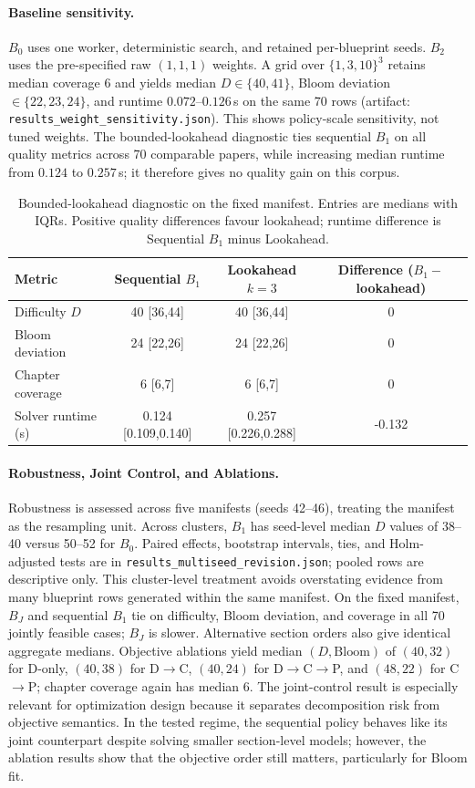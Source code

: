 \documentclass[runningheads]{llncs}
\begin{document}
\paragraph{Baseline sensitivity.} $B_0$ uses one worker, deterministic search, and retained per-blueprint seeds. $B_2$ uses the pre-specified raw $(1,1,1)$ weights. A grid over $\{1,3,10\}^3$ retains median coverage 6 and yields median $D\in\{40,41\}$, Bloom deviation $\in\{22,23,24\}$, and runtime $0.072$--$0.126$\,s on the same 70 rows (artifact: \texttt{results\_weight\_sensitivity.json}). This shows policy-scale sensitivity, not tuned weights.
The bounded-lookahead diagnostic ties sequential $B_1$ on all quality metrics across 70 comparable papers, while increasing median runtime from $0.124$ to $0.257$\,s; it therefore gives no quality gain on this corpus.
\begin{table}[t]
\caption{Bounded-lookahead diagnostic on the fixed manifest. Entries are medians with IQRs. Positive quality differences favour lookahead; runtime difference is Sequential $B_1$ minus Lookahead.}
\label{tab:lookahead}
\centering
\small
\begin{tabular}{@{}lccc@{}}
\toprule
Metric & Sequential $B_1$ & Lookahead $k{=}3$ & Difference ($B_1-$lookahead) \\
\midrule
Difficulty $D$ & 40 [36,44] & 40 [36,44] & 0 \\
Bloom deviation & 24 [22,26] & 24 [22,26] & 0 \\
Chapter coverage & 6 [6,7] & 6 [6,7] & 0 \\
Solver runtime (s) & 0.124 [0.109,0.140] & 0.257 [0.226,0.288] & -0.132 \\
\bottomrule
\end{tabular}
\end{table}
\paragraph{Robustness, Joint Control, and Ablations.}
Robustness is assessed across five manifests (seeds 42--46), treating the manifest as the resampling unit. Across clusters, $B_1$ has seed-level median $D$ values of 38--40 versus 50--52 for $B_0$. Paired effects, bootstrap intervals, ties, and Holm-adjusted tests are in \texttt{results\_multiseed\_revision.json}; pooled rows are descriptive only. This cluster-level treatment avoids overstating evidence from many blueprint rows generated within the same manifest.
On the fixed manifest, $B_J$ and sequential $B_1$ tie on difficulty, Bloom deviation, and coverage in all 70 jointly feasible cases; $B_J$ is slower. Alternative section orders also give identical aggregate medians. Objective ablations yield median $(D,\mathrm{Bloom})$ of $(40,32)$ for D-only, $(40,38)$ for D$\to$C, $(40,24)$ for D$\to$C$\to$P, and $(48,22)$ for C$\to$P; chapter coverage again has median 6.
The joint-control result is especially relevant for optimization design because it separates decomposition risk from objective semantics. In the tested regime, the sequential policy behaves like its joint counterpart despite solving smaller section-level models; however, the ablation results show that the objective order still matters, particularly for Bloom fit.
\end{document}
